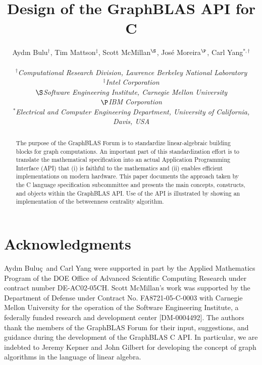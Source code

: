 \documentclass[10pt, conference, compsocconf,letter]{IEEEtran}
\title{Design of the GraphBLAS API for C}
\author{
Ayd\i n Bulu\qc$^\dag$, Tim Mattson$^\ddag$, Scott McMillan$^\S$, Jos\'e Moreira$^\P$, Carl Yang$^{*,\dag}$ \\
\\

 \normalsize
{\em $^\dag$Computational Research Division, Lawrence Berkeley
  National Laboratory}    \\ {\em $^\ddag$Intel Corporation} \\
 {\em $\S$Software Engineering Institute, Carnegie Mellon University} \\  {\em $\P$IBM Corporation}\\
 {\em $^*$Electrical and Computer Engineering Department, University of California, Davis, USA}
 }
\newcommand{\qc}{\c{c}}
\begin{document}
\maketitle

\begin{abstract}

The purpose of the GraphBLAS Forum is to standardize linear-algebraic
building blocks for graph computations.  An important part of this
standardization effort is to translate the mathematical specification
into an actual Application Programming Interface (API) that (i) is
faithful to the mathematics and (ii) enables efficient implementations
on modern hardware. This paper documents the approach taken by the C
language specification subcommittee and presents the main concepts,
constructs, and objects within the GraphBLAS API. Use of the API is
illustrated by showing an implementation of the betweenness centrality
algorithm.

\end{abstract}









\section*{Acknowledgments}

Ayd\i n Bulu\qc\ and Carl Yang were supported in part by the Applied Mathematics Program
of the DOE Office of Advanced Scientific Computing Research under contract
number DE-AC02-05\-CH.  Scott McMillan's work was supported by the
Department of Defense under Contract No. FA8721-05-C-0003 with Carnegie
Mellon University for the operation of the Software Engineering Institute,
a federally funded research and development center [DM-0004492].  The authors 
thank the members of the GraphBLAS Forum for their input, suggestions,
and guidance during the development of the GraphBLAS C
API. In particular, we are indebted to Jeremy Kepner and John
Gilbert for developing the concept of graph algorithms in the language
of linear algebra.



\end{document}
